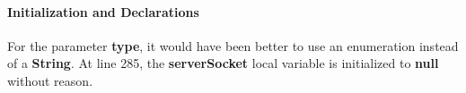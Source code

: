 \paragraph{Initialization and Declarations}
\begin{itemize}
		For the parameter \textbf{type}, it would have been better to use an enumeration instead of a \textbf{String}.
		At line 285, the \textbf{serverSocket} local variable is initialized to \textbf{null} without reason.
\end{itemize}
%
%
%
%
%
